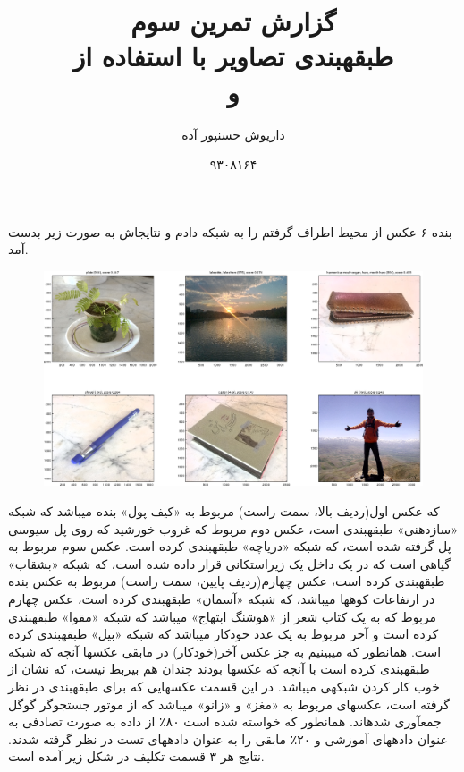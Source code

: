 \documentclass[10pt,a4paper]{article}
\newcommand{\نیمفاصله}{\halfspace}
\renewcommand{\ }{\halfspace}
\newcommand{\مق}{\lr}
\begin{document}
\title{گزارش تمرین سوم
\\
طبقه\ بندی تصاویر با استفاده از\\
 و 
}
\author{داریوش حسن\ پور آده}
\date{۹۳۰۸۱۶۴}
\maketitle
{}
بنده ۶ عکس از محیط اطراف گرفتم را به شبکه دادم و نتایج\ اش به صورت زیر بدست آمد.
\begin{figure}[h!]
\centering
\includegraphics[width=\textwidth]{../sec_A/results/results}
\end{figure}
 که عکس اول(ردیف بالا، سمت راست) مربوط به «کیف پول» بنده می\ باشد که شبکه «سازدهنی» طبقه\ بندی است، عکس دوم مربوط که غروب خورشید که روی پل سی\ وسی پل گرفته شده است، که شبکه «دریاچه» طبقه\ بندی کرده است. عکس سوم مربوط به گیاهی است که در یک داخل یک زیراستکانی قرار داده شده است، که شبکه «بشقاب» طبقه\ بندی کرده است، عکس چهارم(ردیف پایین، سمت راست) مربوط به عکس بنده در ارتفاعات کوه\ ها می\ باشد، که شبکه «آسمان» طبقه\ بندی کرده است، عکس چهارم مربوط که به یک کتاب شعر از «هوشنگ ابتهاج» می\ باشد که شبکه «مقوا» طبقه\ بندی کرده است و آخر مربوط به یک عدد خودکار می\ باشد که شبکه «بیل» طبقه\ بندی کرده است.  همان\ طور که می\ بینیم به جز عکس آخر(خودکار) در مابقی عکس\ ها آنچه که شبکه طبقه\ بندی کرده است با آنچه که عکس\ ها بودند چندان هم بی\ ربط نیست، که نشان از خوب کار کردن شبکه\ ی \مق{GoogleNet} می\ باشد.
در این قسمت عکس\ هایی که برای طبقه\ بندی در نظر گرفته است، عکس\ های \مق{MRI} مربوط به «مغز» و «زانو» می\ باشد که از موتور جستجوگر گوگل جمع\ آوری شده\ اند. همان\ طور که خواسته شده است ۸۰٪ از داده به صورت تصادفی به عنوان داده\ های آموزشی و ۲۰٪ مابقی را به عنوان داده\ های تست در نظر گرفته شدند. نتایج هر ۳ قسمت تکلیف در شکل زیر آمده است.
\end{document}

